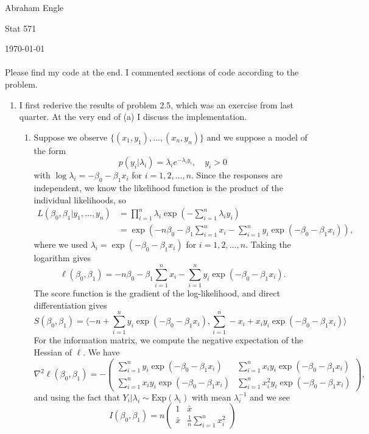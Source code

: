 \documentclass[11pt]{article}
\begin{document}
\pagestyle{empty}
\hfill Abraham Engle

\hfill Stat 571

\hfill \today\\ \\
Please find my code at the end. I commented sections of code according to the problem.
\begin{enumerate}
	\item I first rederive the results of problem 2.5, which was an exercise from last quarter. At the very end of (a) I discuss the implementation.
		\begin{enumerate}
			\item Suppose we observe $\{(x_1,y_1),\dotsc,(x_n,y_n)\}$ and we suppose a model of the form
	\[
		p(y_i|\lambda_i)=\lambda_ie^{-\lambda_iy_i},\quad y_i>0
	\]
	with $\log\lambda_i = -\beta_0-\beta_1x_i$ for $i=1,2,\dotsc,n$.
Since the responses are independent, we know the likelihood function is the product of the individual likelihoods, so
		\begin{align*}
			L(\beta_0,\beta_1|y_1,\dotsc,y_n) &= \prod_{i=1}^n \lambda_i	\exp\left(-\sum_{i=1}^n\lambda_iy_i\right) \\
			&= \exp\left(-n\beta_0-\beta_1\sum_{i=1}^n x_i- \sum_{i=1}^ny_i\exp(-\beta_0-\beta_1x_i)\right),
		\end{align*}
		where we used $\lambda_i = \exp(-\beta_0-\beta_1x_i)$ for $i=1,2,\dotsc,n$. Taking the logarithm gives
		\[
			\ell(\beta_0,\beta_1) = -n\beta_0 - \beta_1\sum_{i=1}^n x_i - \sum_{i=1}^n y_i\exp(-\beta_0-\beta_1x_i). 
		\]
		The score function is the gradient of the log-likelihood, and direct differentiation gives
		\[
			S(\beta_0,\beta_1) = \langle -n + \sum_{i=1}^n y_i\exp(-\beta_0-\beta_1x_i),  \sum_{i=1}^n -x_i + x_iy_i\exp(-\beta_0-\beta_1x_i)\rangle
		\]
		For the information matrix, we compute the negative expectation of the Hessian of $\ell$. We have
		\[
			\nabla^2 \ell(\beta_0,\beta_1) = -\begin{pmatrix}
			\sum_{i=1}^n y_i\exp(-\beta_0-\beta_1x_i) & \sum_{i=1}^n x_iy_i\exp(-\beta_0-\beta_1x_i) \\ \sum_{i=1}^n x_iy_i\exp(-\beta_0-\beta_1x_i) & \sum_{i=1}^n x_i^2y_i\exp(-\beta_0-\beta_1x_i)
			\end{pmatrix},
		\]
		and using the fact that $Y_i|\lambda_i \sim \mathrm{Exp}(\lambda_i)$ with mean $\lambda_i^{-1}$ and we see
		\[
			I(\beta_0,\beta_1) = n\begin{pmatrix} 1 & \bar{x} \\  \bar{x} & \frac{1}{n}\sum_{i=1}^n x_i^2		\end{pmatrix}
\]
\end{enumerate}
\end{enumerate}
\end{document}

